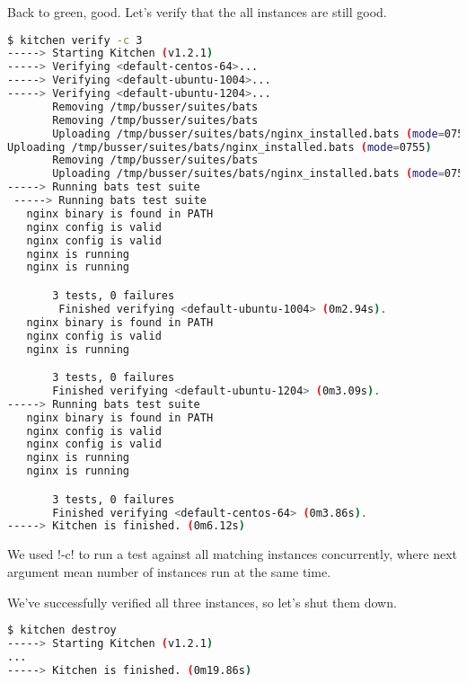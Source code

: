 Back to green, good. Let's verify that the all instances are still good.

\begin{lstlisting}[language=Bash,label=lst:testing-test-kitchen32]
$ kitchen verify -c 3
-----> Starting Kitchen (v1.2.1)
-----> Verifying <default-centos-64>...
-----> Verifying <default-ubuntu-1004>...
-----> Verifying <default-ubuntu-1204>...
       Removing /tmp/busser/suites/bats
       Removing /tmp/busser/suites/bats
       Uploading /tmp/busser/suites/bats/nginx_installed.bats (mode=0755)
Uploading /tmp/busser/suites/bats/nginx_installed.bats (mode=0755)
       Removing /tmp/busser/suites/bats
       Uploading /tmp/busser/suites/bats/nginx_installed.bats (mode=0755)
-----> Running bats test suite
 -----> Running bats test suite                                             1/3
   nginx binary is found in PATH
   nginx config is valid                                                    2/3
   nginx config is valid
   nginx is running                                                         3/3
   nginx is running

       3 tests, 0 failures
        Finished verifying <default-ubuntu-1004> (0m2.94s).                 1/3
   nginx binary is found in PATH
   nginx config is valid
   nginx is running

       3 tests, 0 failures
       Finished verifying <default-ubuntu-1204> (0m3.09s).
-----> Running bats test suite
   nginx binary is found in PATH
   nginx config is valid                                                    2/3
   nginx config is valid
   nginx is running                                                         3/3
   nginx is running

       3 tests, 0 failures
       Finished verifying <default-centos-64> (0m3.86s).
-----> Kitchen is finished. (0m6.12s)
\end{lstlisting}

We used \inline!-c! to run a test against all matching instances concurrently, where next argument mean number of instances run at the same time.

We've successfully verified all three instances, so let's shut them down.

\begin{lstlisting}[language=Bash,label=lst:testing-test-kitchen33]
$ kitchen destroy
-----> Starting Kitchen (v1.2.1)
...
-----> Kitchen is finished. (0m19.86s)
\end{lstlisting}

